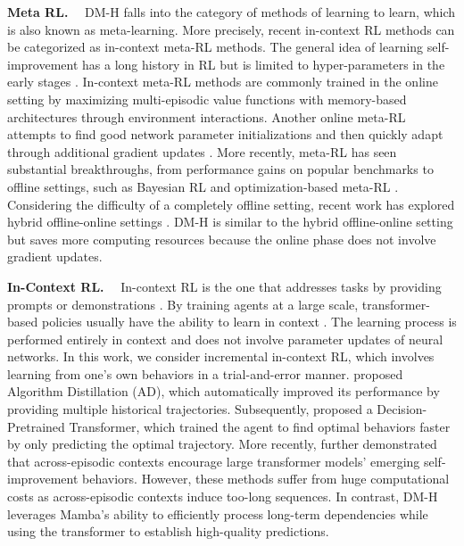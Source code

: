 \noindent\textbf{Meta RL.}~~
DM-H falls into the category of methods of learning to learn, which is also known as meta-learning. More precisely, recent in-context RL methods can be categorized as in-context meta-RL methods. The general idea of learning self-improvement has a long history in RL but is limited to hyper-parameters in the early stages \cite{31}. In-context meta-RL methods \cite{33,32} are commonly trained in the online setting by maximizing multi-episodic value functions with memory-based architectures through environment interactions. Another online meta-RL attempts to find good network parameter initializations and then quickly adapt through additional gradient updates \cite{46,45}. More recently, meta-RL has seen substantial breakthroughs, from performance gains on popular benchmarks to offline settings, such as Bayesian RL \cite{36} and optimization-based meta-RL \cite{37}. Considering the difficulty of a completely offline setting, recent work has explored hybrid offline-online settings \cite{34,35}. DM-H is similar to the hybrid offline-online setting but saves more computing resources because the online phase does not involve gradient updates.

\noindent\textbf{In-Context RL.}~~
In-context RL is the one that addresses tasks by providing prompts or demonstrations \cite{2,43}. By training agents at a large scale, transformer-based policies usually have the ability to learn in context \cite{14,27}. The learning process is performed entirely in context and does not involve parameter updates of neural networks. In this work, we consider incremental in-context RL, which involves learning from one's own behaviors in a trial-and-error manner. \citet{8} proposed Algorithm Distillation (AD), which automatically improved its performance by providing multiple historical trajectories. Subsequently, \citet{3} proposed a Decision-Pretrained Transformer, which trained the agent to find optimal behaviors faster by only predicting the optimal trajectory. More recently, \citet{1} further demonstrated that across-episodic contexts encourage large transformer models' emerging self-improvement behaviors. However, these methods suffer from huge computational costs as across-episodic contexts induce too-long sequences. In contrast, DM-H leverages Mamba's ability to efficiently process long-term dependencies while using the transformer to establish high-quality predictions.

